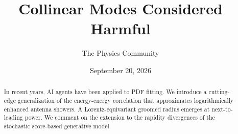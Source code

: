 \documentclass[11pt]{article}
\title{Collinear Modes Considered Harmful}
\author{The Physics Community}
\date{September 20, 2026}
\numberwithin{equation}{section}
\theoremstyle{definition}
\theoremstyle{remark}
\begin{document}
\maketitle
\begin{abstract}
In recent years, AI agents have been applied to PDF fitting. We
introduce a cutting-edge generalization of the energy-energy correlation
that approximates logarithmically enhanced antenna showers. A
Lorentz-equivariant groomed radius emerges at next-to-leading power. We
comment on the extension to the rapidity divergences of the stochastic
score-based generative model.
\end{abstract}
\tableofcontents





\nocite{*}


\end{document}
